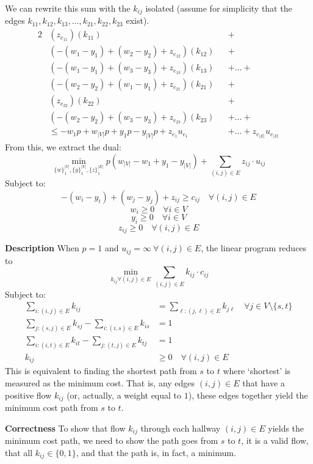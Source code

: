 \documentclass[12pt,twoside]{article}
\begin{document}
\begin{problems}
\begin{problemparts}
We can rewrite this sum with the $k_{ij}$ isolated (assume for simplicity that
the edges $k_{11}, k_{12}, k_{13}, \ldots, k_{21}, k_{22}, k_{23}$ exist).
\begin{alignat*}{2}
  &(z_{e_{11}})(k_{11}) &&+ \\
  &\left(-(w_1 - y_{1}) + (w_2 - y_{2}) + z_{e_{12}}\right)(k_{12}) &&+ \\
  &\left(-(w_1 - y_{1}) + (w_3 - y_{3}) + z_{e_{13}}\right)(k_{13}) &&+ \ldots + \\
  &\left(-(w_2 - y_{2}) + (w_1 - y_{1}) + z_{e_{21}}\right)(k_{21}) &&+ \\
  &(z_{e_{22}})(k_{22}) &&+ \\
  &\left(-(w_2 - y_{2}) + (w_3 - y_{3}) + z_{e_{23}}\right)(k_{23}) &&+ \ldots + \\
  & \leq -w_1 p + w_{|V|} p + y_{1} p - y_{|V|} p + z_{e_{1}}
    u_{e_{1}} &&+ \ldots + z_{e_{|E|}} u_{e_{|E|}}
\end{alignat*}
From this, we extract the dual:
$$ \min_{\{w\}_1^{|V|}, \{y\}_1^{|V|}, \{z\}_1^{|E|}} p \left(w_{|V|} - w_1 +
y_1 - y_{|V|}\right) + \sum_{(i, j) \in E} z_{ij} \cdot u_{ij} $$
Subject to:
$$ -(w_i - y_i) + (w_j - y_j) + z_{ij} \geq c_{ij} \quad \forall (i, j) \in E $$
$$ w_i \geq 0 \quad \forall i \in V $$
$$ y_i \geq 0 \quad \forall i \in V $$
$$ z_{ij} \geq 0 \quad \forall (i, j) \in E $$

\problempart %

{\bf Description} When $p = 1$ and $u_{ij} = \infty\ \forall (i, j) \in E$,
the linear program reduces to
$$ \min_{k_{ij} \forall (i, j) \in E} \sum_{(i, j) \in E} k_{ij} \cdot c_{ij} $$
Subject to:
\begin{align*}
  \sum_{i:(i, j) \in E} k_{ij} &= \sum_{\ell:(j, \ell) \in E} k_{j\ell}\quad
  \forall j \in V \setminus \{s, t\} \\
  \sum_{j:(s, j) \in E} k_{sj} - \sum_{i:(i, s) \in E} k_{is} &= 1 \\
  \sum_{i:(i, t) \in E} k_{it} - \sum_{j:(t, j) \in E} k_{tj} &= 1 \\
  k_{ij} &\geq 0\quad \forall (i, j) \in E
\end{align*}
This is equivalent to finding the shortest path from $s$ to $t$ where
`shortest' is measured as the minimum cost. That is, any edges $(i, j) \in E$
that have a positive flow $k_{ij}$ (or, actually, a weight equal to $1$),
these edges together yield the minimum cost path from $s$ to $t$.

{\bf Correctness} To show that flow $k_{ij}$ through each hallway $(i, j) \in
E$ yields the minimum cost path, we need to show the path goes from $s$ to
$t$, it is a valid flow, that all $k_{ij} \in \{0, 1\}$, and that the path
is, in fact, a minimum.


\end{problemparts}
\end{problems}
\end{document}
